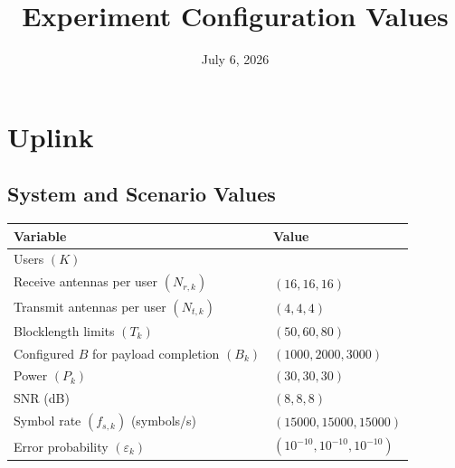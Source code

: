 \documentclass[11pt]{article}
\title{Experiment Configuration Values}
\author{}
\date{July 6, 2026}
\begin{document}
\maketitle

\section*{Uplink}

\subsection*{System and Scenario Values}
\footnotesize
\begin{longtable}{>{\raggedright\arraybackslash}p{} >{\raggedright\arraybackslash}p{}}
\toprule
Variable & Value \\
\midrule
\endhead
Users \((K)\) & 3 \\
Receive antennas per user \((N_{r,k})\) & \((16,16,16)\) \\
Transmit antennas per user \((N_{t,k})\) & \((4,4,4)\) \\
Blocklength limits \((T_k)\) & \((50,60,80)\) \\
Configured \(B\) for payload completion \((B_k)\) & \((1000,2000,3000)\) \\
Power \((P_k)\) & \((30,30,30)\) \\
SNR (dB) & \((8,8,8)\) \\
Symbol rate \((f_{s,k})\) (symbols/s) & \((15000,15000,15000)\) \\
Error probability \((\varepsilon_k)\) & \((10^{-10},10^{-10},10^{-10})\) \\
\bottomrule
\end{longtable}
\end{document}
